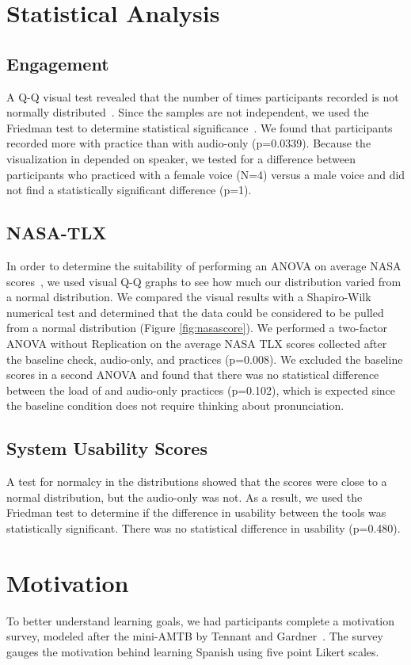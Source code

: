 \section{Statistical Analysis}
\subsection{Engagement}
A Q-Q visual test revealed that the number of times participants recorded is not normally distributed~\cite{das2016brief}. Since the samples are not independent, we used the Friedman test to determine statistical significance~\cite{sheldon1996use}. We found that participants recorded more with \visowel{} practice than with audio-only (p=0.0339). Because the visualization in \visowel{} depended on speaker, we tested for a difference between participants who practiced with a female voice (N=4) versus a male voice and did not find a statistically significant difference (p=1).
\subsection{NASA-TLX}
In order to determine the suitability of performing an ANOVA on average NASA scores~\cite{st1989analysis}, we used visual Q-Q graphs to see how much our distribution varied from a normal distribution. We compared the visual results with a Shapiro-Wilk numerical test and determined that the data could be considered to be pulled from a normal distribution (Figure \ref{fig:nasascore}). We performed a two-factor ANOVA without Replication on the average NASA TLX scores collected after the baseline check, audio-only, and \visowel{} practices (p=0.008). We excluded the baseline scores in a second ANOVA and found that there was no statistical difference between the load of \visowel{} and audio-only practices (p=0.102), which is expected since the baseline condition does not require thinking about pronunciation.
\subsection{System Usability Scores}
A test for normalcy in the distributions showed that the \visowel{} scores were close to a normal distribution, but the audio-only was not. As a result, we used the Friedman test to determine if the difference in usability between the tools was statistically significant. There was no statistical difference in usability (p=0.480).

\section{Motivation}
To better understand learning goals, we had participants complete a motivation survey, modeled after the mini-AMTB by Tennant and Gardner~\cite{tennant2004computerized}. The survey gauges the motivation behind learning Spanish using five point Likert scales. 

